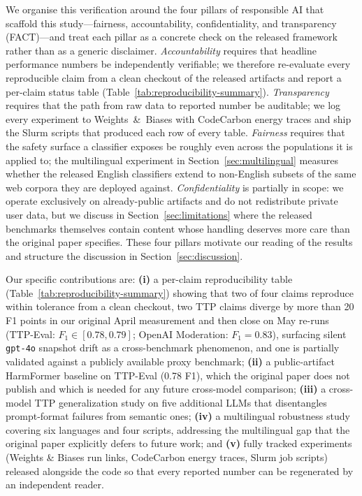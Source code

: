 \documentclass[10pt]{article} %
\begin{document}
We organise this verification around the four pillars of responsible AI that scaffold this study---fairness, accountability, confidentiality, and transparency (FACT)---and treat each pillar as a concrete check on the released framework rather than as a generic disclaimer. \emph{Accountability} requires that headline performance numbers be independently verifiable; we therefore re-evaluate every reproducible claim from a clean checkout of the released artifacts and report a per-claim status table (Table~\ref{tab:reproducibility-summary}). \emph{Transparency} requires that the path from raw data to reported number be auditable; we log every experiment to Weights~\&~Biases with CodeCarbon energy traces and ship the Slurm scripts that produced each row of every table. \emph{Fairness} requires that the safety surface a classifier exposes be roughly even across the populations it is applied to; the multilingual experiment in Section~\ref{sec:multilingual} measures whether the released English classifiers extend to non-English subsets of the same web corpora they are deployed against. \emph{Confidentiality} is partially in scope: we operate exclusively on already-public artifacts and do not redistribute private user data, but we discuss in Section~\ref{sec:limitations} where the released benchmarks themselves contain content whose handling deserves more care than the original paper specifies. These four pillars motivate our reading of the results and structure the discussion in Section~\ref{sec:discussion}.

Our specific contributions are: \textbf{(i)} a per-claim reproducibility table (Table~\ref{tab:reproducibility-summary}) showing that two of four claims reproduce within tolerance from a clean checkout, two TTP claims diverge by more than 20 F1 points in our original April measurement and then close on May re-runs (TTP-Eval: $F_1 \in [0.78, 0.79]$; OpenAI Moderation: $F_1=0.83$), surfacing silent \texttt{gpt-4o} snapshot drift as a cross-benchmark phenomenon, and one is partially validated against a publicly available proxy benchmark; \textbf{(ii)} a public-artifact HarmFormer baseline on TTP-Eval (0.78 F1), which the original paper does not publish and which is needed for any future cross-model comparison; \textbf{(iii)} a cross-model TTP generalization study on five additional LLMs that disentangles prompt-format failures from semantic ones; \textbf{(iv)} a multilingual robustness study covering six languages and four scripts, addressing the multilingual gap that the original paper explicitly defers to future work; and \textbf{(v)} fully tracked experiments (Weights \& Biases run links, CodeCarbon energy traces, Slurm job scripts) released alongside the code so that every reported number can be regenerated by an independent reader.
\end{document}
